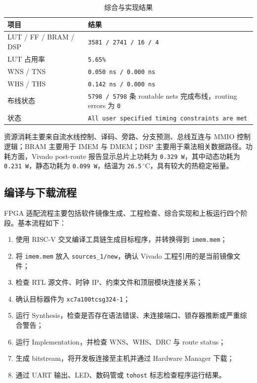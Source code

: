﻿\documentclass[12pt,a4paper]{ctexart}
\begin{document}
\begin{table}[H]
    \centering
    \caption{综合与实现结果}
    \label{tab:fpga_impl_result}
    \begin{tabularx}{\textwidth}{lX}
        \toprule
        项目 & 结果 \\
        \midrule
        LUT / FF / BRAM / DSP & \texttt{3581 / 2741 / 16 / 4} \\
        LUT 占用率 & \texttt{5.65\%} \\
        WNS / TNS & \texttt{0.050 ns / 0.000 ns} \\
        WHS / THS & \texttt{0.142 ns / 0.000 ns} \\
        布线状态 & \texttt{5798 / 5798} 条 routable nets 完成布线，routing errors 为 \texttt{0} \\
        状态 & \texttt{All user specified timing constraints are met} \\
        \bottomrule
    \end{tabularx}
\end{table}

资源消耗主要来自流水线控制、译码、旁路、分支预测、总线互连与 MMIO 控制逻辑；BRAM 主要用于 IMEM 与 DMEM；DSP 主要用于乘法相关数据路径。功耗方面，Vivado post-route 报告显示总片上功耗为 \texttt{0.329 W}，其中动态功耗为 \texttt{0.231 W}，静态功耗为 \texttt{0.099 W}，结温为 \texttt{26.5}$\,^{\circ}\mathrm{C}$，具有较大的热稳定裕量。

\subsection{编译与下载流程}
FPGA 适配流程主要包括软件镜像生成、工程检查、综合实现和上板运行四个阶段。基本流程如下：
\begin{enumerate}
    \item 使用 RISC-V 交叉编译工具链生成目标程序，并转换得到 \texttt{imem.mem}；
    \item 将 \texttt{imem.mem} 放入 \texttt{sources\_1/new}，确认 Vivado 工程引用的是当前镜像文件；
    \item 检查 RTL 源文件、时钟 IP、约束文件和顶层模块连接关系；
    \item 确认目标器件为 \texttt{xc7a100tcsg324-1}；
    \item 运行 Synthesis，检查是否存在语法错误、未连接端口、锁存器推断或严重综合警告；
    \item 运行 Implementation，并检查 WNS、WHS、DRC 与 route status；
    \item 生成 bitstream，将开发板连接至主机并通过 Hardware Manager 下载；
    \item 通过 UART 输出、LED、数码管或 \texttt{tohost} 标志检查程序运行结果。
\end{enumerate}
\end{document}
